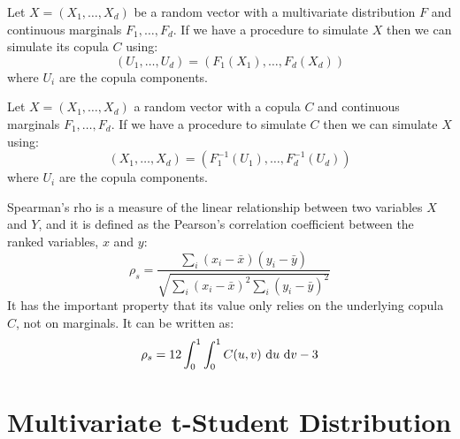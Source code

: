 \documentclass[11pt,fleqn]{book} %
\begin{document}
\begin{corollary}
	\label{cor:cop2}
	Let $X=(X_1, \dots, X_d)$ be a random vector with a multivariate 
	distribution $F$ and continuous marginals $F_1, \dots, F_d$.
	If we have a procedure to simulate $X$ then we can simulate 
	its copula $C$ using:
	\begin{displaymath}
		(U_1, \dots, U_d) = (F_1(X_1), \dots, F_d(X_d))
	\end{displaymath}
	where $U_i$ are the copula components.
\end{corollary}

\begin{corollary}
	\label{cor:cop3}
	Let $X=(X_1, \dots, X_d)$ a random vector with a copula $C$
	and continuous marginals $F_1, \dots, F_d$. If we have a
	procedure to simulate $C$ then we can simulate $X$ using:
	\begin{displaymath}
		(X_1, \dots, X_d) = (F_1^{-1}(U_1), \dots, F_d^{-1}(U_d))
	\end{displaymath}
	where $U_i$ are the copula components.
\end{corollary}

\begin{definition}
	Spearman's rho is a measure of the linear relationship between two 
	variables $X$ and $Y$, and it is defined as the Pearson's correlation 
	coefficient between the ranked variables, $x$ and $y$:
	\begin{displaymath}
		\rho_s = \frac{\displaystyle \sum_i (x_i-\bar{x}) (y_i-\bar{y})}
		{\sqrt{\displaystyle \sum_i (x_i-\bar{x})^2 \sum_i (y_i-\bar{y})^2}}
	\end{displaymath}
	It has the important property that its value only relies on the underlying 
	copula $C$, not on marginals. It can be written as:
	\begin{displaymath}
		\rho_s = 12 \displaystyle \int_0^1 \int_0^1 C(u,v) \mathop{\,\mathrm{{}d}}\mathopen{} u \mathop{\,\mathrm{{}d}}\mathopen{} v -3
	\end{displaymath}
\end{definition}

\section{Multivariate t-Student Distribution}
\label{ap:mtsd}
\end{document}

